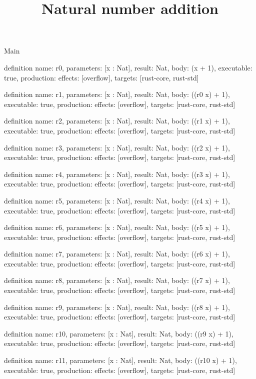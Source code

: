 \begin{lexlean}{Main}
\title{Natural number addition}
\begin{semanticmodule}
definition{
  name: r0,
  parameters: [x : Nat],
  result: Nat,
  body: (x + 1),
  executable: true,
  production: {effects: [overflow], targets: [rust-core, rust-std]}
}

definition{
  name: r1,
  parameters: [x : Nat],
  result: Nat,
  body: ((r0 x) + 1),
  executable: true,
  production: {effects: [overflow], targets: [rust-core, rust-std]}
}

definition{
  name: r2,
  parameters: [x : Nat],
  result: Nat,
  body: ((r1 x) + 1),
  executable: true,
  production: {effects: [overflow], targets: [rust-core, rust-std]}
}

definition{
  name: r3,
  parameters: [x : Nat],
  result: Nat,
  body: ((r2 x) + 1),
  executable: true,
  production: {effects: [overflow], targets: [rust-core, rust-std]}
}

definition{
  name: r4,
  parameters: [x : Nat],
  result: Nat,
  body: ((r3 x) + 1),
  executable: true,
  production: {effects: [overflow], targets: [rust-core, rust-std]}
}

definition{
  name: r5,
  parameters: [x : Nat],
  result: Nat,
  body: ((r4 x) + 1),
  executable: true,
  production: {effects: [overflow], targets: [rust-core, rust-std]}
}

definition{
  name: r6,
  parameters: [x : Nat],
  result: Nat,
  body: ((r5 x) + 1),
  executable: true,
  production: {effects: [overflow], targets: [rust-core, rust-std]}
}

definition{
  name: r7,
  parameters: [x : Nat],
  result: Nat,
  body: ((r6 x) + 1),
  executable: true,
  production: {effects: [overflow], targets: [rust-core, rust-std]}
}

definition{
  name: r8,
  parameters: [x : Nat],
  result: Nat,
  body: ((r7 x) + 1),
  executable: true,
  production: {effects: [overflow], targets: [rust-core, rust-std]}
}

definition{
  name: r9,
  parameters: [x : Nat],
  result: Nat,
  body: ((r8 x) + 1),
  executable: true,
  production: {effects: [overflow], targets: [rust-core, rust-std]}
}

definition{
  name: r10,
  parameters: [x : Nat],
  result: Nat,
  body: ((r9 x) + 1),
  executable: true,
  production: {effects: [overflow], targets: [rust-core, rust-std]}
}

definition{
  name: r11,
  parameters: [x : Nat],
  result: Nat,
  body: ((r10 x) + 1),
  executable: true,
  production: {effects: [overflow], targets: [rust-core, rust-std]}
}


\end{semanticmodule}
\end{lexlean}
